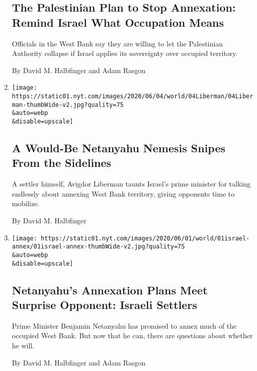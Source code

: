 \begin{enumerate}
  \hypertarget{the-palestinian-plan-to-stop-annexation-remind-israel-what-occupation-means}{%
  \subsection{The Palestinian Plan to Stop Annexation: Remind Israel
  What Occupation
  Means}\label{the-palestinian-plan-to-stop-annexation-remind-israel-what-occupation-means}}

  Officials in the West Bank say they are willing to let the Palestinian
  Authority collapse if Israel applies its sovereignty over occupied
  territory.

  By David M. Halbfinger and Adam Rasgon
\item
  \href{/2020/06/04/world/middleeast/israel-liberman-netanyahu-annexation-west-bank.html}{}

  \texttt{[image: https://static01.nyt.com/images/2020/06/04/world/04Liberman/04Liberman-thumbWide-v2.jpg?quality=75\\\&auto=webp\\\&disable=upscale]}

  \hypertarget{a-would-be-netanyahu-nemesis-snipes-from-the-sidelines}{%
  \subsection{A Would-Be Netanyahu Nemesis Snipes From the
  Sidelines}\label{a-would-be-netanyahu-nemesis-snipes-from-the-sidelines}}

  A settler himself, Avigdor Liberman taunts Israel's prime minister for
  talking endlessly about annexing West Bank territory, giving opponents
  time to mobilize.

  By David M. Halbfinger
\item
  \href{/2020/06/01/world/middleeast/israel-annex-netanyahu-westbank.html}{}

  \texttt{[image: https://static01.nyt.com/images/2020/06/01/world/01israel-annex/01israel-annex-thumbWide-v2.jpg?quality=75\\\&auto=webp\\\&disable=upscale]}

  \hypertarget{netanyahus-annexation-plans-meet-surprise-opponent-israeli-settlers}{%
  \subsection{Netanyahu's Annexation Plans Meet Surprise Opponent:
  Israeli
  Settlers}\label{netanyahus-annexation-plans-meet-surprise-opponent-israeli-settlers}}

  Prime Minister Benjamin Netanyahu has promised to annex much of the
  occupied West Bank. But now that he can, there are questions about
  whether he will.

  By David M. Halbfinger and Adam Rasgon
\end{enumerate}

